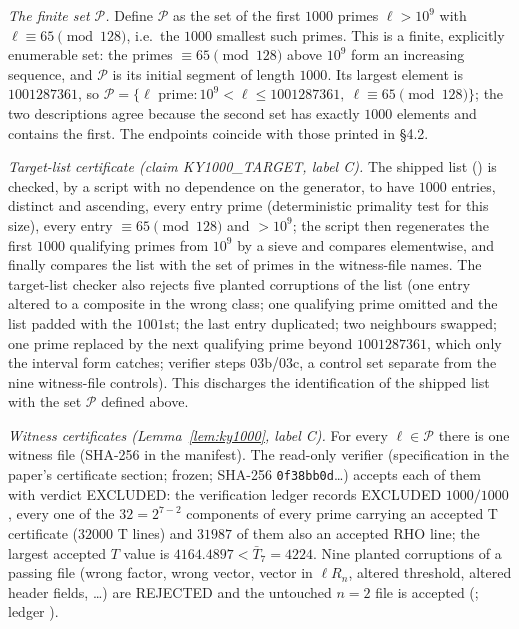 \emph{The finite set $\mathcal P$.} Define $\mathcal P$ as the set of the first $1000$ primes $\ell>10^9$ with $\ell\equiv65\pmod{128}$, i.e.\ the $1000$ smallest such primes. This is a finite, explicitly enumerable set: the primes $\equiv65\pmod{128}$ above $10^9$ form an increasing sequence, and $\mathcal P$ is its initial segment of length $1000$. Its largest element is $1001287361$, so $\mathcal P=\{\ell\text{ prime}:10^9<\ell\le1001287361,\ \ell\equiv65\pmod{128}\}$; the two descriptions agree because the second set has exactly $1000$ elements and contains the first. The endpoints coincide with those printed in \cite{KY} \S4.2.

\emph{Target-list certificate (claim KY1000\_TARGET, label C).} The shipped list () is checked, by a script with no dependence on the generator, to have $1000$ entries, distinct and ascending, every entry prime (deterministic primality test for this size), every entry $\equiv65\pmod{128}$ and $>10^9$; the script then regenerates the first $1000$ qualifying primes from $10^9$ by a sieve and compares elementwise, and finally compares the list with the set of primes in the witness-file names. The target-list checker also rejects five planted corruptions of the list (one entry altered to a composite in the wrong class; one qualifying prime omitted and the list padded with the $1001$st; the last entry duplicated; two neighbours swapped; one prime replaced by the next qualifying prime beyond $1001287361$, which only the interval form catches; verifier steps 03b/03c, a control set separate from the nine witness-file controls). This discharges the identification of the shipped list with the set $\mathcal P$ defined above.

\emph{Witness certificates (Lemma~\ref{lem:ky1000}, label C).} For every $\ell\in\mathcal P$ there is one witness file (SHA-256 in the manifest). The read-only verifier  (specification in the paper's certificate section; frozen; SHA-256 \texttt{0f38bb0d}\ldots) accepts each of them with verdict EXCLUDED: the verification ledger records EXCLUDED $1000/1000$, every one of the $32=2^{7-2}$ components of every prime carrying an accepted T certificate ($32000$ T lines) and $31987$ of them also an accepted RHO line; the largest accepted $T$ value is $4164.4897<\bar T_7=4224$. Nine planted corruptions of a passing file (wrong factor, wrong vector, vector in $\ell R_n$, altered threshold, altered header fields, \ldots) are REJECTED and the untouched $n=2$ file is accepted (; ledger ).

